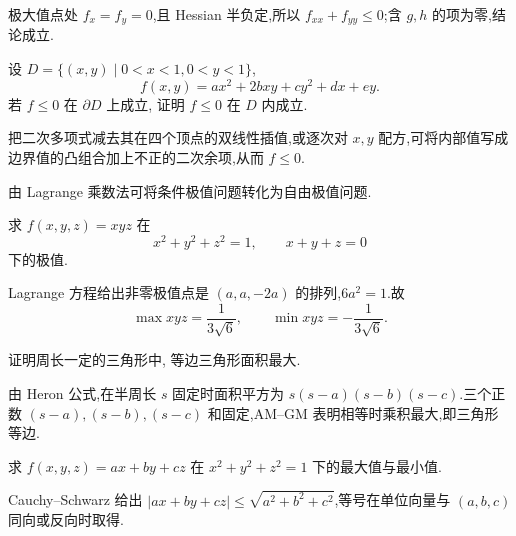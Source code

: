 \begin{solution}
    极大值点处 $f_x=f_y=0$,且 Hessian 半负定,所以 $f_{xx}+f_{yy}\leq0$;含 $g,h$ 的项为零,结论成立.
\end{solution}

\begin{example}
    设 $D=\{(x,y)\mid0<x<1,0<y<1\}$,
    \[
        f(x,y)=ax^2+2bxy+cy^2+dx+ey.
    \]
    若 $f\leq0$ 在 $\partial D$ 上成立, 证明 $f\leq0$ 在 $D$ 内成立.
\end{example}
\exampleblank

\begin{solution}
    把二次多项式减去其在四个顶点的双线性插值,或逐次对 $x,y$ 配方,可将内部值写成边界值的凸组合加上不正的二次余项,从而 $f\leq0$.
\end{solution}




由 Lagrange 乘数法可将条件极值问题转化为自由极值问题.

\begin{example}
    求 $f(x,y,z)=xyz$ 在
    \[
        x^2+y^2+z^2=1,
        \qquad x+y+z=0
    \]
    下的极值.
\end{example}
\exampleblank

\begin{solution}
    Lagrange 方程给出非零极值点是 $(a,a,-2a)$ 的排列,$6a^2=1$.故
    \[
        \max xyz=\dfrac{1}{3\sqrt{6}},\qquad
        \min xyz=-\dfrac{1}{3\sqrt{6}}.
    \]
\end{solution}

\begin{example}
    证明周长一定的三角形中, 等边三角形面积最大.
\end{example}
\exampleblank

\begin{solution}
    由 Heron 公式,在半周长 $s$ 固定时面积平方为 $s(s-a)(s-b)(s-c)$.三个正数 $(s-a),(s-b),(s-c)$ 和固定,AM--GM 表明相等时乘积最大,即三角形等边.
\end{solution}

\begin{example}
    求 $f(x,y,z)=ax+by+cz$ 在 $x^2+y^2+z^2=1$ 下的最大值与最小值.
\end{example}
\exampleblank

\begin{solution}
    Cauchy--Schwarz 给出 $|ax+by+cz|\leq\sqrt{a^2+b^2+c^2}$,等号在单位向量与 $(a,b,c)$ 同向或反向时取得.
\end{solution}

